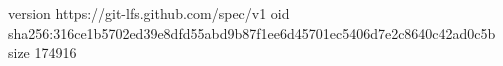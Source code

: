 version https://git-lfs.github.com/spec/v1
oid sha256:316ce1b5702ed39e8dfd55abd9b87f1ee6d45701ec5406d7e2c8640c42ad0c5b
size 174916

